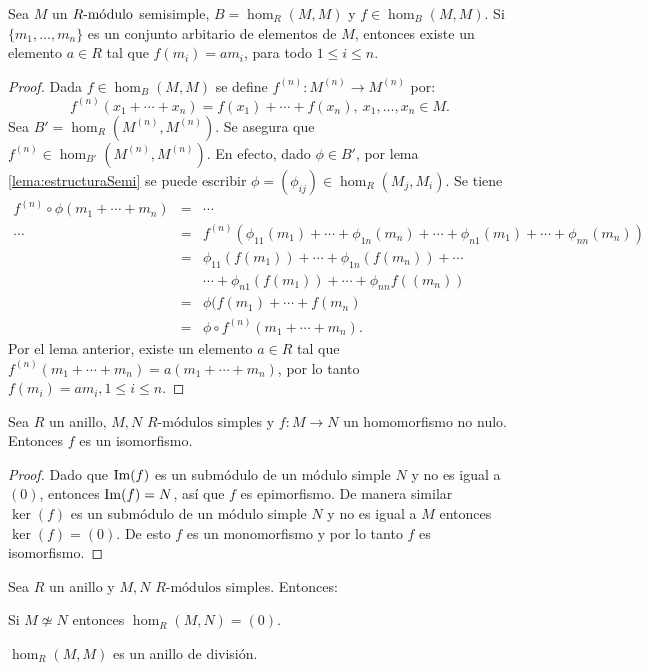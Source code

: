 \begin{teorema}
Sea $M$ un $\modulo{R}$ semisimple, $B= \hom_R(M,M)$ y $f \in  \hom_B(M,M)$. Si $\{ m_1, \dots, m_n \}$ es un conjunto arbitario de elementos de $M$, entonces existe un elemento $a \in R$ tal que $f(m_i) = am_i$, para todo $1\leq i \leq n$.
\end{teorema}
\begin{proof}
Dada $f \in \hom_B(M,M)$ se define $f^{(n)} \colon M^{(n)} \to M^{(n)}$ por: \[ f^{(n)}(x_1 + \cdots + x_n) = f(x_1) + \cdots+ f(x_n), \ x_1, \dots, x_n \in M. \]
Sea $B' = \hom_R(M^{(n)}, M^{(n)})$. Se asegura que $f^{(n)} \in \hom_{B'}(M^{(n)}, M^{(n)})$. En efecto, dado $\phi \in B'$, por lema \ref{lema:estructuraSemi} se puede escribir $\phi = (\phi_{ij}) \in \hom_R(M_j,M_i)$. Se tiene
\begin{eqnarray*}
f^{(n)} \circ \phi(m_1+\cdots +m_n) &=& \cdots \\ 
\cdots &=& f^{(n)}(\phi_{11}(m_1) +\cdots+\phi_{1n}(m_n)+\cdots+\phi_{n1}(m_1)+\cdots+\phi_{nn}(m_n))  \\
&=& \phi_{11}(f(m_1)) + \cdots + \phi_{1n}(f(m_n)) + \cdots \\ 
& &\cdots + \phi_{n1}(f(m_1 )) + \cdots + \phi_{nn}f((m_n))   \\
&=& \phi(f(m_1) + \cdots + f(m_n)  \\
&=&\phi \circ f^{(n)}(m_1 + \cdots + m_n).
\end{eqnarray*}
Por el lema anterior, existe un elemento $a \in R$ tal que $f^{(n)}(m_1+\cdots+m_n) = a(m_1+\cdots+m_n)$, por lo tanto $f(m_i) = am_i, 1\leq i \leq n$.
\end{proof}
\begin{lema}
Sea $R$ un anillo, $M,N$ $R\mbox{-módulos}$ simples y $f \colon M \to N$ un homomorfismo no nulo. Entonces $f$ es un isomorfismo.
\end{lema}
\begin{proof}
Dado que $\Ima(f)$ es un submódulo de un módulo simple $N$ y no es igual a $(0)$, entonces $\Ima(f) = N$, así que $f$ es epimorfismo. De manera similar $\ker(f)$ es un submódulo de un módulo simple $N$ y no es igual a $M$ entonces $\ker(f) = (0)$. De esto $f$ es un monomorfismo y por lo tanto $f$ es isomorfismo.
\end{proof}
\begin{corolario}
Sea $R$ un anillo y $M,N$ $R\mbox{-módulos}$ simples. Entonces:
\begin{bulletList}
\item Si $M \not\simeq N$ entonces $\hom_R(M,N) = (0)$.
\item $\hom_R(M,M)$ es un anillo de división. 
\end{bulletList}
\end{corolario}
